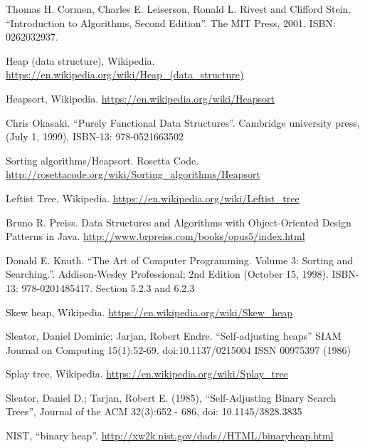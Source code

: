 \documentclass[b5paper]{article}
\begin{document}
\begin{thebibliography}{99}

Thomas H. Cormen, Charles E. Leiserson, Ronald L. Rivest and Clifford Stein. ``Introduction to Algorithms, Second Edition''. The MIT Press, 2001. ISBN: 0262032937.

Heap (data structure), Wikipedia. \url{https://en.wikipedia.org/wiki/Heap_(data_structure)}

Heapsort, Wikipedia. \url{https://en.wikipedia.org/wiki/Heapsort}

Chris Okasaki. ``Purely Functional Data Structures''. Cambridge university press, (July 1, 1999), ISBN-13: 978-0521663502

Sorting algorithms/Heapsort. Rosetta Code. \url{http://rosettacode.org/wiki/Sorting_algorithms/Heapsort}

Leftist Tree, Wikipedia. \url{https://en.wikipedia.org/wiki/Leftist_tree}

Bruno R. Preiss. Data Structures and Algorithms with Object-Oriented Design Patterns in Java. \url{http://www.brpreiss.com/books/opus5/index.html}

Donald E. Knuth. ``The Art of Computer Programming. Volume 3: Sorting and Searching.''. Addison-Wesley Professional;
2nd Edition (October 15, 1998). ISBN-13: 978-0201485417. Section 5.2.3 and 6.2.3

Skew heap, Wikipedia. \url{https://en.wikipedia.org/wiki/Skew_heap}

Sleator, Daniel Dominic; Jarjan, Robert Endre. ``Self-adjusting heaps'' SIAM Journal on Computing 15(1):52-69. doi:10.1137/0215004 ISSN 00975397 (1986)

Splay tree, Wikipedia. \url{https://en.wikipedia.org/wiki/Splay_tree}

Sleator, Daniel D.; Tarjan, Robert E. (1985), ``Self-Adjusting Binary Search Trees'', Journal of the ACM 32(3):652 - 686, doi: 10.1145/3828.3835

NIST, ``binary heap''. \url{http://xw2k.nist.gov/dads//HTML/binaryheap.html}

\end{thebibliography}

\expandafter\enddocument
\fi
\end{document}
